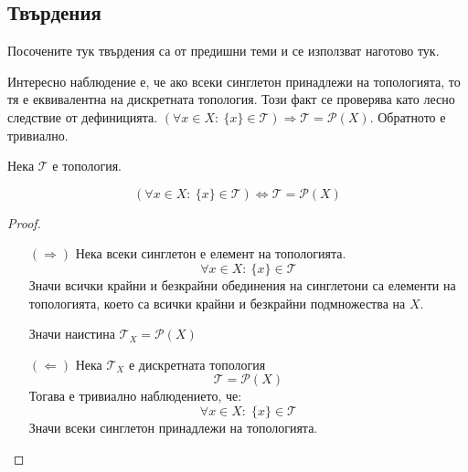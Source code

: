\subsection{Твърдения}
Посочените тук твърдения са от предишни теми и се използват наготово тук.

Интересно наблюдение е, че ако всеки синглетон принадлежи на топологията, то тя е еквивалентна на дискретната топология. Този факт се проверява като лесно следствие от дефиницията. $(\forall x \in X:\ \{x\} \in \mathcal T) \Rightarrow \mathcal T = \mathcal P(X)$. Обратното е тривиално.
\begin{lemma}
    Нека $\mathcal T$ е топология.

    \begin{equation*}
        (\forall x \in X:\ \{x\} \in \mathcal T) \iff \mathcal T = \mathcal P (X)
    \end{equation*}
\end{lemma}
\begin{proof}
    \begin{itemize}
        \item[$(\Rightarrow)$] Нека всеки синглетон е елемент на топологията.
        \begin{equation}
            \forall x \in X:\ \{x\} \in \mathcal T
        \end{equation}
        Значи всички крайни и безкрайни обединения на синглетони са елементи на топологията, което са всички крайни и безкрайни подмножества на $X$.
        
        Значи наистина $\mathcal T_X = \mathcal P (X)$

        \item[$(\Leftarrow)$] Нека $\mathcal T_X$ е дискретната топология
        \begin{equation}
            \mathcal T = \mathcal P (X)
        \end{equation}
        Тогава е тривиално наблюдението, че:
        \begin{equation}
            \forall x \in X:\; \{x\} \in \mathcal T
        \end{equation}
        Значи всеки синглетон принадлежи на топологията.
    \end{itemize}
\end{proof}